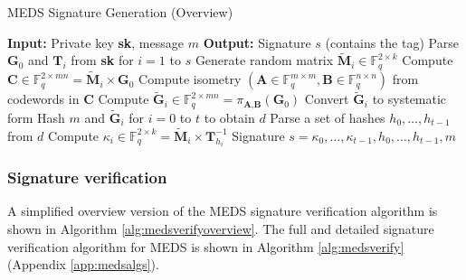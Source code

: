\documentclass[11pt,a4paper]{report}
\theoremstyle{definition}
\begin{document}
\begin{algorithm}
  \caption{MEDS Signature Generation (Overview)}
  \label{alg:medssignoverview}
  \begin{algorithmic}[1]
    \State \textbf{Input:} Private key \textbf{sk}, message $m$
    \State \textbf{Output:} Signature $s$ (contains the tag)
    \State Parse $\textbf{G}_0$ and $\textbf{T}_i$ from \textbf{sk} for $i = 1$ to $s$
      \State Generate random matrix $\tilde{\textbf{M}}_i \in \mathbb{F}_q^{2 \times k}$
      \State Compute $\textbf{C} \in \mathbb{F}_q^{2 \times mn} = \tilde{\textbf{M}}_i \times \textbf{G}_0$
      \State Compute isometry $(\textbf{A} \in \mathbb{F}_q^{m \times m}, \textbf{B} \in \mathbb{F}_q^{n \times n})$ from codewords in $\textbf{C}$
      \State Compute $\tilde{\textbf{G}}_i \in \mathbb{F}_q^{2 \times mn} = \pi_{\textbf{A}, \textbf{B}}(\textbf{G}_0)$
      \State Convert $\tilde{\textbf{G}}_i$ to systematic form
    \EndFor
    \State Hash $m$ and $\tilde{\textbf{G}}_i$ for $i = 0$ to $t$ to obtain $d$
    \State Parse a set of hashes $h_0, \ldots, h_{t-1}$ from $d$
        \State Compute $\kappa_i \in \mathbb{F}_q^{2 \times k} = \tilde{\textbf{M}}_i \times \textbf{T}^{-1}_{h_i}$
      \EndIf
    \EndFor
    \State \Return Signature $s = \kappa_0, \ldots, \kappa_{t-1}, h_0, \ldots, h_{t-1}, m$
  \end{algorithmic}
\end{algorithm}

\subsubsection{Signature verification}
A simplified overview version of the MEDS signature verification algorithm is shown in Algorithm \ref{alg:medsverifyoverview}. The full and detailed signature verification algorithm for MEDS is shown in Algorithm \ref{alg:medsverify} (Appendix \ref{app:medsalgs}).
\end{document}
